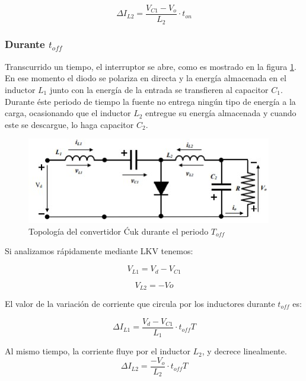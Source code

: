 \documentclass[conference]{IEEEtran}
\begin{document}
\begin{equation}
    \Delta I_{L2}=\frac{V_{C1}-V_o}{L_2}\cdot t_{on}
\end{equation}

\subsubsection{Durante $t_{off}$}

Transcurrido un tiempo, el interruptor se abre, como es mostrado en la figura \ref{fig: Ćuk toff}. En ese momento el diodo se polariza en directa y la energía almacenada en el inductor $L_1$ junto con la energía de la entrada se transfieren al capacitor $C_1$. Durante éste periodo de tiempo la fuente no entrega ningún tipo de energía a la carga, ocasionando que el inductor $L_2$ entregue su energía almacenada y cuando este se descargue, lo haga capacitor $C_2$.

\begin{figure}[h]
    \centering
    \includegraphics[scale=0.8]{imagenes/cuk toff.jpg}
    \caption{Topología del convertidor Ćuk durante el periodo $T_{off}$}
    \label{fig: Ćuk toff}
\end{figure}

Si analizamos rápidamente mediante LKV tenemos:

\begin{equation}
    V_{L1}=V_d-V_{C1}
\end{equation}

\begin{equation}
    V_{L2}=-Vo
\end{equation}

El valor de la variación de corriente que circula por los inductores durante $t_{off}$ es:

\begin{equation}
    \Delta I_{L1}=\frac{V_d-V_{C1}}{L_1}\cdot t_{off}T
    \label{ecu: deltail1-2}
\end{equation}

Al mismo tiempo, la corriente fluye por el inductor $L_2$, y decrece linealmente.
\begin{equation}
    \Delta I_{L2}=\frac{-V_o}{L_2}\cdot t_{off}T
\end{equation}
\end{document}
